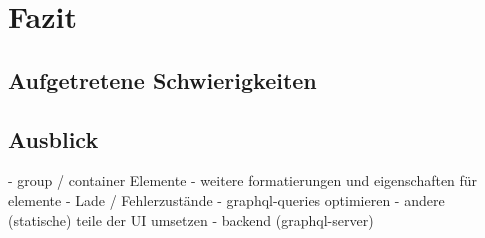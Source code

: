\chapter{Fazit}\label{chap:conclusion}

\section{Aufgetretene Schwierigkeiten}

\section{Ausblick}
- group / container Elemente
- weitere formatierungen und eigenschaften für elemente
- Lade / Fehlerzustände
- graphql-queries optimieren
- andere (statische) teile der UI umsetzen
- backend (graphql-server)
